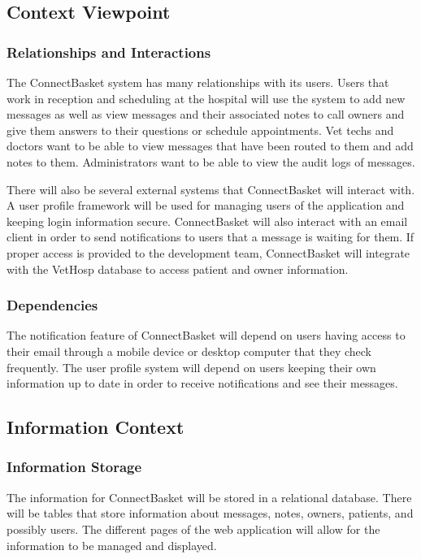 \documentclass[onecolumn, draftclsnofoot,10pt, compsoc]{IEEEtran}
\begin{document}
\subsection{Context Viewpoint}

\subsubsection{Relationships and Interactions}
The ConnectBasket system has many relationships with its users. Users that work in reception and scheduling at the hospital will use the system to add new messages as well as view messages and their associated notes to call owners and give them answers to their questions or schedule appointments. Vet techs and doctors want to be able to view messages that have been routed to them and add notes to them. Administrators want to be able to view the audit logs of messages.

There will also be several external systems that ConnectBasket will interact with. A user profile framework will be used for managing users of the application and keeping login information secure. ConnectBasket will also interact with an email client in order to send notifications to users that a message is waiting for them. If proper access is provided to the development team, ConnectBasket will integrate with the VetHosp database to access patient and owner information.

\subsubsection{Dependencies}
The notification feature of ConnectBasket will depend on users having access to their email through a mobile device or desktop computer that they check frequently. The user profile system will depend on users keeping their own information up to date in order to receive notifications and see their messages.

\subsection{Information Context}

\subsubsection{Information Storage}
The information for ConnectBasket will be stored in a relational database. There will be tables that store information about messages, notes, owners, patients, and possibly users.  The different pages of the web application will allow for the information to be managed and displayed.
\end{document}
